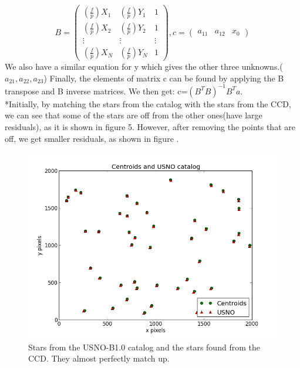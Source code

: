 \documentclass[letterpaper,12pt]{article}
\begin{document}
\begin{equation}
B=
\begin{pmatrix}
  (\frac{f}{p})X_{1}  & (\frac{f}{p})Y_{1}  & 1 \\
  (\frac{f}{p})X_{2}  & (\frac{f}{p})Y_{2}  & 1 \\
  \vdots  & \vdots    & \vdots  \\
  (\frac{f}{p})X_{N}  & (\frac{f}{p})Y_{N} & 1 
 \end{pmatrix}, 
 c=
\begin{pmatrix}
  a_{11} & a_{12} & x_{0}
 \end{pmatrix}
\end{equation}
We also have a similar equation for y which gives the other three unknowns.(\begin{math} a_{21}, a_{22}, a_{23}\end{math})
Finally, the elements of matrix c can be found by applying the B transpose and B inverse matrices. We then get:
c=\begin{math}(B^TB)^{-1} B^T a \end{math}.
\\*Initially, by matching the stars from the catalog with the stars from the CCD, we can see that some of the stars are off from the other ones(have large residuals), as it is shown in figure 5. However, after removing the points that are off, we get smaller residuals, as shown in figure .



\FloatBarrier
\begin{figure}[h!]
\centering
\includegraphics[scale=0.5]{centroids_catalog_together.png}
\caption{Stars from the USNO-B1.0 catalog and the stars found from the CCD. They almost perfectly match up.}
\end{figure}
\FloatBarrier
\end{document}
